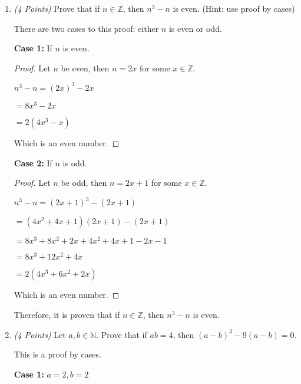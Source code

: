 \documentclass[10pt]{article} %
\newcommand{\N}{\mathbb{N}}
\newcommand{\Z}{\mathbb{Z}}
\newcommand{\points}[1]{{\it (#1 Points)}}
\begin{document}
\begin{enumerate}
 \bigskip

\item \points{4} Prove that if $n\in \Z$, then $n^3-n$ is even. (Hint: use proof by cases)

\bigskip


There are two cases to this proof: either $n$ is even or odd.  

\begin{raggedright} {\bf Case 1:} If $n$ is even. \end{raggedright}

\begin{proof}
Let $n$ be even, then $n = 2x$ for some $x \in \Z$.  

$n^3 -n = (2x)^3 - 2x$

$ = 8x^3 - 2x$

$ = 2 (4x^3 - x)$

Which is an even number.  
\end{proof}

\begin{raggedright} {\bf Case 2:} If $n$ is odd. \end{raggedright}

\begin{proof}
Let $n$ be odd, then $n = 2x + 1$ for some $x \in \Z$.  

$n^3 - n = (2x + 1)^3 - (2x + 1)$

$ = (4x^2 + 4x + 1)(2x + 1) - (2x + 1)$

$ = 8x^3 + 8x^2 + 2x + 4x^2 + 4x + 1 - 2x - 1$

$ = 8x^3 + 12x^2 + 4x$

$ = 2(4x^3 + 6x^2 + 2x)$

Which is an even number.  

\end{proof}

\begin{raggedright} Therefore, it is proven that if $n\in \Z$, then $n^3 - n$ is even.  \end{raggedright}

\bigskip

\item \points{4} Let $a,b\in \N$. Prove that if $ab=4$, then $(a-b)^3-9(a-b)=0$.

\bigskip


This is a proof by cases.  

\begin{raggedright} {\bf Case 1:} $a = 2, b = 2$ \end{raggedright}


\end{enumerate}
\end{document}
